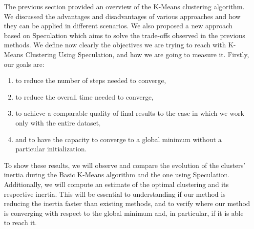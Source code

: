 The previous section provided an overview of the K-Means clustering algorithm. We discussed the advantages and disadvantages of various approaches and how they can be applied in different scenarios. We also proposed a new approach based on Speculation which aims to solve the trade-offs observed in the previous methods.
We define now clearly the objectives we are trying to reach with K-Means Clustering Using Speculation, and how we are going to measure it.
Firstly, our goals are:
\begin{enumerate}
    \item to reduce the number of steps needed to converge,
    \item to reduce the overall time needed to converge,
    \item to achieve a comparable quality of final results to the case in which we work only with the entire dataset,
    \item and to have the capacity to converge to a global minimum without a particular initialization.
\end{enumerate}
To show these results, we will observe and compare the evolution of the clusters' inertia during the Basic K-Means algorithm and the one using Speculation. Additionally, we will compute an estimate of the optimal clustering and its respective inertia.
This will be essential to understanding if our method is reducing the inertia faster than existing methods, and to verify where our method is converging with respect to the global minimum and, in particular, if it is able to reach it.